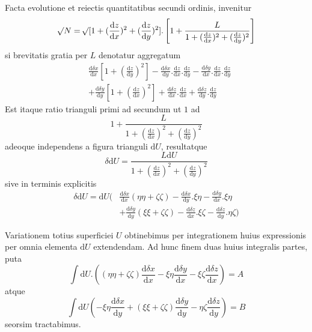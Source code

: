 Facta evolutione et reiectis quantitatibus secundi ordinis, invenitur
\[
\mathord{{}^{}\!\surd}N=\mathord{{}^{}\!\surd}[1+(\frac{\mathrm{d}z}{\mathrm{d}x})^2+(\frac{\mathrm{d}z}{\mathrm{d}y})^2].\left[1+\frac{L}{1+(\frac{\mathrm{d}z}{\mathrm{d}x})^2+(\frac{\mathrm{d}z}{\mathrm{d}y})^2}\right]
\]
si brevitatis gratia per $L$ denotatur aggregatum
\[
\begin{aligned}
&\frac{\mathrm{d}\delta x}{\mathrm{d}x}[1+(\frac{\mathrm{d}z}{\mathrm{d}y})^2]-\frac{\mathrm{d}\delta x}{\mathrm{d}y}.\frac{\mathrm{d}z}{\mathrm{d}x}.\frac{\mathrm{d}z}{\mathrm{d}y}-\frac{\mathrm{d}\delta y}{\mathrm{d}x}.\frac{\mathrm{d}z}{\mathrm{d}x}.\frac{\mathrm{d}z}{\mathrm{d}y}\\
&+\frac{\mathrm{d}\delta y}{\mathrm{d}y}[1+(\frac{\mathrm{d}z}{\mathrm{d}x})^2]+\frac{\mathrm{d}\delta z}{\mathrm{d}x}.\frac{\mathrm{d}z}{\mathrm{d}x}+\frac{\mathrm{d}\delta z}{\mathrm{d}y}.\frac{\mathrm{d}z}{\mathrm{d}y}
\end{aligned}
\]
Est itaque ratio trianguli primi ad secundum ut $1$ ad
\[
1+\frac{L}{1+(\frac{\mathrm{d}z}{\mathrm{d}x})^2+(\frac{\mathrm{d}z}{\mathrm{d}y})^2}
\]
adeoque independens a figura trianguli $\mathrm{d}U$, resultatque
\[
\delta\mathrm{d}U=\frac{L\mathrm{d}U}{1+(\frac{\mathrm{d}z}{\mathrm{d}x})^2+(\frac{\mathrm{d}z}{\mathrm{d}y})^2}
\]
sive in terminis explicitis
\[
\begin{aligned}
\delta\mathrm{d}U=\mathrm{d}U\big(&\frac{\mathrm{d}\delta x}{\mathrm{d}x}(\eta\eta+\zeta\zeta)-\frac{\mathrm{d}\delta x}{\mathrm{d}y}.\xi\eta-\frac{\mathrm{d}\delta y}{\mathrm{d}x}.\xi\eta\\
&+\frac{\mathrm{d}\delta y}{\mathrm{d}y}(\xi\xi+\zeta\zeta)-\frac{\mathrm{d}\delta z}{\mathrm{d}x}.\xi\zeta-\frac{\mathrm{d}\delta z}{\mathrm{d}y}.\eta\zeta\big)
\end{aligned}
\]

Variationem totius superficiei $U$ obtinebimus per integrationem huius expressionis per omnia elementa $\mathrm{d}U$ extendendam. Ad hunc finem duas huius integralis partes, puta
\[
\int\mathrm{d}U.((\eta\eta+\zeta\zeta)\frac{\mathrm{d}\delta x}{\mathrm{d}x}-\xi\eta\frac{\mathrm{d}\delta y}{\mathrm{d}x}-\xi\zeta\frac{\mathrm{d}\delta z}{\mathrm{d}x})=A
\]
atque
\[
\int\mathrm{d}U(-\xi\eta\frac{\mathrm{d}\delta x}{\mathrm{d}y}+(\xi\xi+\zeta\zeta)\frac{\mathrm{d}\delta y}{\mathrm{d}y}-\eta\zeta\frac{\mathrm{d}\delta z}{\mathrm{d}y})=B
\]
seorsim tractabimus.

